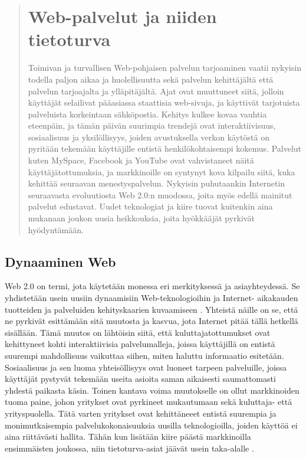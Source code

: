 
\ifdefined\seminaari
\begin{abstract}
\else
\chapter{Web-palvelut ja niiden tietoturva}
\fi

Toimivan ja turvallisen Web-pohjaisen palvelun tarjoaminen vaatii
nykyisin todella paljon aikaa ja huolellisuutta sekä palvelun kehittäjältä että
palvelun tarjoajalta ja ylläpitäjältä. Ajat ovat muuttuneet siitä,
jolloin käyttäjät selailivat pääasiassa staattisia web-sivuja, ja käyttivät tarjotuista
palveluista korkeintaan sähköpostia. Kehitys kulkee kovaa vauhtia eteenpäin, ja
tämän päivän suurimpia trendejä ovat interaktiivisuus, sosiaalisuus ja yksilöllisyys, 
joiden avustuksella verkon käytöstä on pyritään tekemään
käyttäjille entistä henkilökohtaisempi kokemus. Palvelut kuten MySpace,
Facebook ja YouTube ovat vahvistaneet näitä käyttäjätottumuksia, ja
markkinoille on syntynyt kova kilpailu siitä, kuka kehittää seuraavan
menestyspalvelun. Nykyisin puhutaankin Internetin seuraavasta evoluutiosta Web 2.0:n 
muodossa, joita myös edellä mainitut palvelut edustavat. Uudet teknologiat ja
kiire tuovat kuitenkin aina mukanaan joukon uusia heikkouksia, joita hyökkääjät
pyrkivät hyödyntämään. 

\ifdefined\seminaari
\end{abstract}
\license
\pagebreak
\else
\relax
\fi

\section{Dynaaminen Web}

Web 2.0 on termi, jota käytetään monessa eri merkityksessä ja
asiayhteydessä. Se yhdistetään usein uusiin dynaamisiin Web-\-teknologioihin ja In\-ter\-net-
ai\-ka\-kau\-den tuotteiden ja palveluiden kehityskaarien kuvaamiseen \cite{WEB2}. Yhteistä näille
on se, että ne pyrkivät esittämään sitä muutosta ja kasvua, jota Internet pitää tällä
hetkellä sisällään. Tämä muutos on lähtöisin siitä, että kuluttajatottumukset
ovat kehittyneet kohti interaktiivisia palvelumalleja, joissa käyttäjillä on
entistä suurempi mahdollisuus vaikuttaa siihen, miten haluttu informaatio esitetään.
Sosiaalisuus ja sen luoma yhteisöllisyys ovat luoneet tarpeen palveluille,
joissa käyttäjät pystyvät tekemään useita asioita saman aikaisesti saumattomasti
yhdestä paikasta käsin. Toinen kantava voima  muutokselle on ollut markkinoiden
tuoma paine, johon yritykset ovat pyrkineet mukautumaan sekä kuluttaja- että yrityspuolella. 
Tätä varten yritykset ovat kehittäneeet entistä suurempia ja 
monimutkaisempia palvelukokonaisuuksia uusilla teknologioilla, joiden käyttöä ei aina riittävästi hallita. 
Tähän kun lisätään kiire päästä markkinoilla ensimmäisten
joukossa, niin tietoturva-asiat jäävät usein taka-alalle \cite{WEB2b}.

